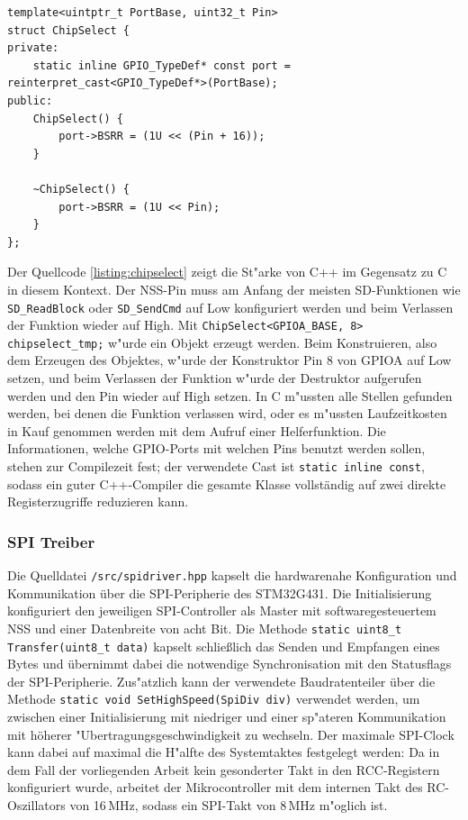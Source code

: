 \documentclass[11pt]{article}
\newcommand{\cpp}[1]{\texttt{#1}}
\begin{document}
\begin{listing}[H]
    \begin{verbatim}
template<uintptr_t PortBase, uint32_t Pin>
struct ChipSelect {
private:
    static inline GPIO_TypeDef* const port = reinterpret_cast<GPIO_TypeDef*>(PortBase);
public:
    ChipSelect() {
        port->BSRR = (1U << (Pin + 16));
    }

    ~ChipSelect() {
        port->BSRR = (1U << Pin);
    }
};
    \end{verbatim}
\caption{Auszug aus der \texttt{src/sdcarddriver.hpp}}
\label{listing:chipselect}
\end{listing}


Der Quellcode \ref{listing:chipselect} zeigt die St"arke von C++ im Gegensatz zu C in diesem Kontext.
Der NSS-Pin muss am Anfang der meisten SD-Funktionen wie \cpp{SD_ReadBlock}
oder \cpp{SD_SendCmd} auf Low konfiguriert werden und beim Verlassen der Funktion wieder auf High.
Mit \cpp{ChipSelect<GPIOA_BASE, 8> chipselect_tmp;} w"urde ein Objekt erzeugt werden. Beim Konstruieren, also dem Erzeugen
des Objektes, w"urde der Konstruktor Pin 8 von GPIOA auf Low setzen, und beim Verlassen der Funktion w"urde der Destruktor aufgerufen
werden und den Pin wieder auf High setzen. In C m"ussten alle Stellen gefunden werden, bei denen die Funktion verlassen wird,
oder es m"ussten Laufzeitkosten in Kauf genommen werden mit dem Aufruf einer Helferfunktion.
Die Informationen, welche GPIO-Ports mit welchen Pins benutzt werden sollen, stehen zur Compilezeit fest; der verwendete
Cast ist \cpp{static inline const},
sodass ein guter C++-Compiler die gesamte Klasse vollständig auf zwei direkte Registerzugriffe reduzieren kann.


\subsubsection{SPI Treiber}
Die Quelldatei \texttt{/src/spidriver.hpp} kapselt die hardwarenahe Konfiguration und Kommunikation über die SPI-Peripherie des STM32G431.
Die Initialisierung konfiguriert den jeweiligen SPI-Controller als Master mit softwaregesteuertem NSS
und einer Datenbreite von acht Bit. Die Methode \cpp{static uint8_t Transfer(uint8_t data)} kapselt schließlich das Senden und Empfangen eines Bytes 
und übernimmt dabei die notwendige Synchronisation mit den Statusflags der SPI-Peripherie.
Zus"atzlich kann der verwendete Baudratenteiler über die Methode \cpp{static void SetHighSpeed(SpiDiv div)} verwendet werden,
um zwischen einer Initialisierung mit niedriger und einer sp"ateren Kommunikation mit höherer "Ubertragungsgeschwindigkeit zu wechseln.
Der maximale SPI-Clock kann dabei auf maximal die H"alfte des Systemtaktes festgelegt werden: Da in dem Fall der vorliegenden Arbeit
kein gesonderter Takt in den RCC-Registern konfiguriert wurde, 
arbeitet der Mikrocontroller mit dem internen Takt des RC-Oszillators von 16\,MHz, sodass ein SPI-Takt von 8\,MHz m"oglich ist.
\end{document}
